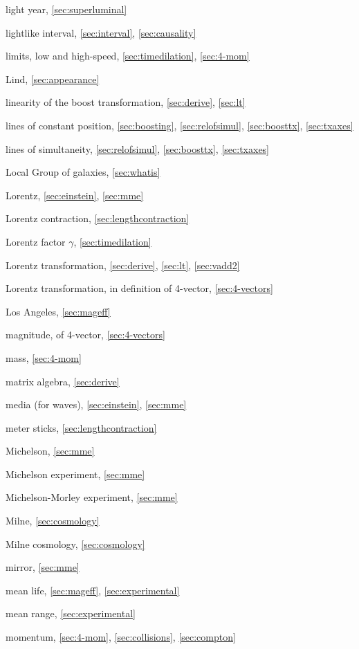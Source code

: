\begin{theindex}
\item light year, \ref{sec:superluminal}
\item lightlike interval, \ref{sec:interval}, \ref{sec:causality}
\item limits, low and high-speed, \ref{sec:timedilation}, \ref{sec:4-mom}
\item Lind, \ref{sec:appearance}
\item linearity of the boost transformation, \ref{sec:derive}, \ref{sec:lt}
\item lines of constant position, \ref{sec:boosting}, \ref{sec:relofsimul},
	\ref{sec:boosttx}, \ref{sec:txaxes}
\item lines of simultaneity, \ref{sec:relofsimul}, \ref{sec:boosttx},
	\ref{sec:txaxes}
\item Local Group of galaxies, \ref{sec:whatis}
\item Lorentz, \ref{sec:einstein}, \ref{sec:mme}
\item Lorentz contraction, \ref{sec:lengthcontraction}
\item Lorentz factor $\gamma$, \ref{sec:timedilation}
\item Lorentz transformation, \ref{sec:derive}, \ref{sec:lt}, \ref{sec:vadd2}
\item Lorentz transformation, in definition of 4-vector, \ref{sec:4-vectors}
\item Los Angeles, \ref{sec:mageff}
\item magnitude, of 4-vector, \ref{sec:4-vectors}
\item mass, \ref{sec:4-mom}
\item matrix algebra, \ref{sec:derive}
\item media (for waves), \ref{sec:einstein}, \ref{sec:mme}
\item meter sticks, \ref{sec:lengthcontraction}
\item Michelson, \ref{sec:mme}
\item Michelson experiment, \ref{sec:mme}
\item Michelson-Morley experiment, \ref{sec:mme}
\item Milne, \ref{sec:cosmology}
\item Milne cosmology, \ref{sec:cosmology}
\item mirror, \ref{sec:mme}
\item mean life, \ref{sec:mageff}, \ref{sec:experimental}
\item mean range, \ref{sec:experimental}
\item momentum, \ref{sec:4-mom}, \ref{sec:collisions}, \ref{sec:compton}

\end{theindex}
